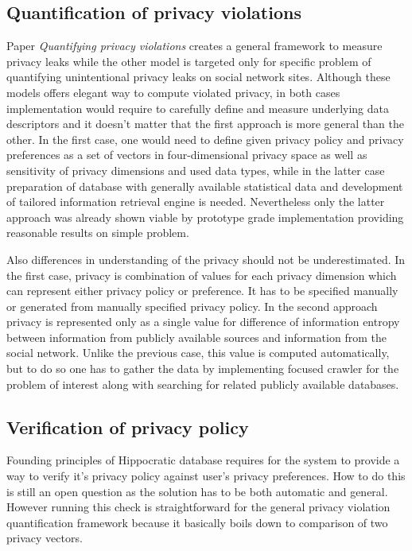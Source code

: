 \documentclass[a4paper]{article}
\begin{document}
\subsection{Quantification of privacy violations}
Paper \emph{Quantifying privacy violations}\cite{paper_qpv} creates a general
framework to measure privacy leaks while the other
model\cite{paper_privacy_sns} is targeted only for specific problem of
quantifying unintentional privacy leaks on social network sites.
Although these models offers elegant way to compute violated privacy,
in both cases implementation would require to carefully define and measure
underlying data descriptors and it doesn't matter that the first approach is
more general than the other.  In the first case, one would need to define given
privacy policy and privacy preferences as a set of vectors in four-dimensional
privacy space as well as sensitivity of privacy dimensions and used data types,
while in the latter case preparation of database with generally
available statistical data and development of tailored information retrieval
engine is needed.  Nevertheless only the latter approach was already shown
viable by prototype grade implementation providing reasonable results on simple
problem.

Also differences in understanding of the privacy should not be underestimated.
In the first case, privacy is combination of values for each privacy dimension
which can represent either privacy policy or preference. It has to be specified
manually or generated from manually specified privacy policy.  In the second
approach privacy is represented only as a single value for difference of
information entropy between information from publicly available sources and
information from the social network. Unlike the previous case, this value is
computed automatically, but to do so one has to gather the data by implementing
focused crawler for the problem of interest along with searching for related
publicly available databases.


\subsection{Verification of privacy policy}
Founding principles of Hippocratic database requires for the system to
provide a way to verify it's privacy policy against user's privacy preferences.
How to do this is still an open question as the solution has to be both
automatic and general.
However running this check is straightforward for the general privacy violation
quantification framework\cite{paper_qpv} because it basically boils down to
comparison of two privacy vectors.
\end{document}
